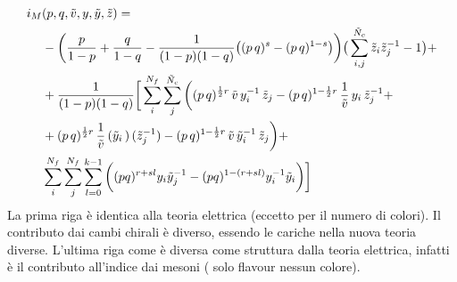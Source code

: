 \documentclass[a4paper,12pt]{article}
\begin{document}
\begin{align*}
 i_M &(p,q, \tilde v, y,\tilde y ,\tilde z) = \\ 
& -\bigg({p \over 1-p}+{q \over 1-q} -{1 \over (1-p)(1-q)} \big((p\,q)^{s}- (p\,q)^{1-s}\big)
\bigg) \big( \sum_{i,j}^{\tilde N_c} \tilde z_i \tilde z_j^{-1} -1\big ) + \\ 
& +{1\over (1-p)(1-q)}\bigg[ \sum_i^{N_f}\sum_j^{\tilde N_c} \bigg( (p\,q)^{{1 \over 2 } r} \,\tilde v \, y_i^{-1}\, \tilde z_j
- (p\,q)^{1- {1\over 2}r} \, {1 \over \tilde v}\, y_i \,   
\tilde z_j^{-1} + \\
& + (p\,q)^{{1 \over 2 } r}\, {1\over \tilde v}\, 
({\tilde y_i}\,) \,  
(\tilde z_j^{-1})
- (p\,q)^{1-  {1\over 2}r} \, \tilde v \, 
{\tilde y_i}^{-1} \, 
\tilde z_j \bigg) + \\
 &\sum_i^{N_f} \sum_j^{N_f} \sum_{l=0}^{k-1}   \bigg(  (pq)^{ r + s l  } y_i \tilde y_j^{-1}   - (pq)^{1 -( r + s l )}
y_i^{-1}  {\tilde y_i}  \bigg) \bigg] \\
\end{align*}
La prima riga è identica alla teoria elettrica (eccetto per il numero di colori).
Il contributo dai cambi chirali è diverso, essendo le cariche nella nuova teoria diverse.
L'ultima riga come è diversa come struttura dalla teoria elettrica, infatti è il contributo all'indice dai mesoni ( solo flavour nessun colore).
\end{document}
